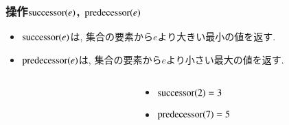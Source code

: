 \documentclass[main]{subfiles}
\begin{document}
\begin{frame}\frametitle{操作$\mathrm{successor}(e)$, $\mathrm{predecessor}(e)$}
\begin{itemize}
	\item $\mathrm{successor}(e)$は, 集合の要素から$e$より大きい最小の値を返す.\\
	\item $\mathrm{predecessor}(e)$は, 集合の要素から$e$より小さい最大の値を返す.\\
\end{itemize}

\begin{columns}[c]
	\begin{column}{0.5\linewidth}
		
	\end{column}
	\begin{column}{0.49\linewidth}
		\begin{itemize}
			\item $\mathrm{successor}(2) = 3$\\
			\item $\mathrm{predecessor}(7) = 5$\\
		\end{itemize}
	\end{column}
\end{columns}
\end{frame}
\end{document}
